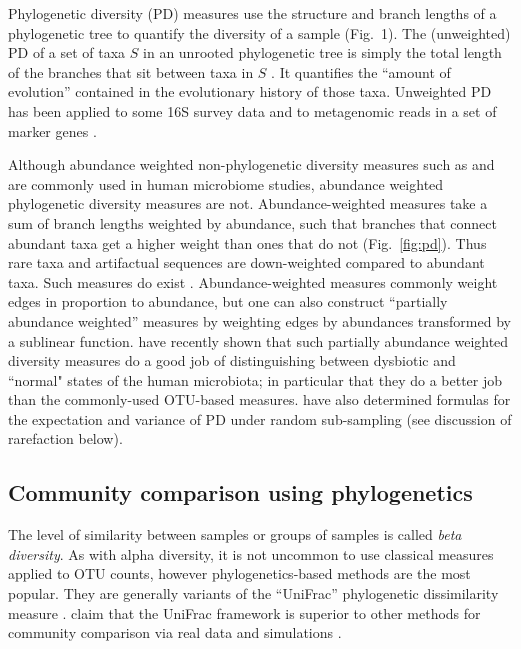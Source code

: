 \documentclass{amsart}
\begin{document}
Phylogenetic diversity (PD) measures use the structure and branch lengths of a phylogenetic tree to quantify the diversity of a sample (Fig.~1).
The (unweighted) PD of a set of taxa $S$ in an unrooted phylogenetic tree is simply the total length of the branches that sit between taxa in $S$ \citep{faith1992conservation}.
It quantifies the ``amount of evolution'' contained in the evolutionary history of those taxa.
Unweighted PD has been applied to some 16S survey data \citep{lozupone2007global,costello2009bacterial} and to metagenomic reads in a set of marker genes \citep{kembel2011phylogenetic}.

Although abundance weighted non-phylogenetic diversity measures such as \citet{simpson1949measurement} and \citet{shannon1948mathematical} are commonly used in human microbiome studies, abundance weighted phylogenetic diversity measures are not.
Abundance-weighted measures take a sum of branch lengths weighted by abundance, such that branches that connect abundant taxa get a higher weight than ones that do not (Fig.~\ref{fig:pd}).
Thus rare taxa and artifactual sequences are down-weighted compared to abundant taxa.
Such measures do exist \citep{rao1982diversity,barker2002phylogenetic,allen2009new,chao2010phylogenetic,vellend2011measuring}.
Abundance-weighted measures commonly weight edges in proportion to abundance, but one can also construct ``partially abundance weighted'' measures by weighting edges by abundances transformed by a sublinear function.
\citet{mccoy2013abundance} have recently shown that such partially abundance weighted diversity measures do a good job of distinguishing between dysbiotic and ``normal" states of the human microbiota; in particular that they do a better job than the commonly-used OTU-based measures.
\citet{nipperess2013mean} have also determined formulas for the expectation and variance of PD under random sub-sampling (see discussion of rarefaction below).


\subsection{Community comparison using phylogenetics}

The level of similarity between samples or groups of samples is called \emph{beta diversity}.
As with alpha diversity, it is not uncommon to use classical measures \citep[e.g.][]{jaccard1908nouvelles} applied to OTU counts, however phylogenetics-based methods are the most popular.
They are generally variants of the ``UniFrac'' phylogenetic dissimilarity measure \citep[as described and named by][]{LozuponeKnightUniFrac05}.
\citet{kuczynski2010microbial} claim that the UniFrac framework is superior to other methods for community comparison via real data and simulations \citep[for a contrary viewpoint using simulations see][]{schloss2008evaluating}.
\end{document}

